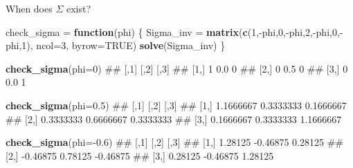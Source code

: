\documentclass[11pt,ignorenonframetext,]{beamer}
\newenvironment{Shaded}{}{}
\newcommand{\KeywordTok}[1]{\textcolor[rgb]{0.00,0.44,0.13}{\textbf{#1}}}
\newcommand{\DataTypeTok}[1]{\textcolor[rgb]{0.56,0.13,0.00}{#1}}
\newcommand{\DecValTok}[1]{\textcolor[rgb]{0.25,0.63,0.44}{#1}}
\newcommand{\FloatTok}[1]{\textcolor[rgb]{0.25,0.63,0.44}{#1}}
\newcommand{\StringTok}[1]{\textcolor[rgb]{0.25,0.44,0.63}{#1}}
\newcommand{\OtherTok}[1]{\textcolor[rgb]{0.00,0.44,0.13}{#1}}
\newcommand{\ControlFlowTok}[1]{\textcolor[rgb]{0.00,0.44,0.13}{\textbf{#1}}}
\newcommand{\OperatorTok}[1]{\textcolor[rgb]{0.40,0.40,0.40}{#1}}
\newcommand{\NormalTok}[1]{#1}
\let\oldShaded\Shaded
\let\endoldShaded\endShaded
\renewenvironment{Shaded}{\footnotesize\begin{spacing}{0.9}\oldShaded}{\endoldShaded\end{spacing}}
\begin{document}
\begin{frame}[fragile,t]{When does \(\Sigma\) exist?}

\begin{Shaded}
\begin{Highlighting}[]
\NormalTok{check_sigma =}\StringTok{ }\ControlFlowTok{function}\NormalTok{(phi) \{}
\NormalTok{  Sigma_inv =}\StringTok{ }\KeywordTok{matrix}\NormalTok{(}\KeywordTok{c}\NormalTok{(}\DecValTok{1}\NormalTok{,}\OperatorTok{-}\NormalTok{phi,}\DecValTok{0}\NormalTok{,}\OperatorTok{-}\NormalTok{phi,}\DecValTok{2}\NormalTok{,}\OperatorTok{-}\NormalTok{phi,}\DecValTok{0}\NormalTok{,}\OperatorTok{-}\NormalTok{phi,}\DecValTok{1}\NormalTok{), }\DataTypeTok{ncol=}\DecValTok{3}\NormalTok{, }\DataTypeTok{byrow=}\OtherTok{TRUE}\NormalTok{) }
  \KeywordTok{solve}\NormalTok{(Sigma_inv)}
\NormalTok{\}}

\KeywordTok{check_sigma}\NormalTok{(}\DataTypeTok{phi=}\DecValTok{0}\NormalTok{)}
\NormalTok{##      [,1] [,2] [,3]}
\NormalTok{## [1,]    1  0.0    0}
\NormalTok{## [2,]    0  0.5    0}
\NormalTok{## [3,]    0  0.0    1}

\KeywordTok{check_sigma}\NormalTok{(}\DataTypeTok{phi=}\FloatTok{0.5}\NormalTok{)}
\NormalTok{##           [,1]      [,2]      [,3]}
\NormalTok{## [1,] 1.1666667 0.3333333 0.1666667}
\NormalTok{## [2,] 0.3333333 0.6666667 0.3333333}
\NormalTok{## [3,] 0.1666667 0.3333333 1.1666667}

\KeywordTok{check_sigma}\NormalTok{(}\DataTypeTok{phi=}\OperatorTok{-}\FloatTok{0.6}\NormalTok{)}
\NormalTok{##          [,1]     [,2]     [,3]}
\NormalTok{## [1,]  1.28125 -0.46875  0.28125}
\NormalTok{## [2,] -0.46875  0.78125 -0.46875}
\NormalTok{## [3,]  0.28125 -0.46875  1.28125}
\end{Highlighting}
\end{Shaded}

\end{frame}
\end{document}
